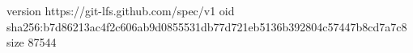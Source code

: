 version https://git-lfs.github.com/spec/v1
oid sha256:b7d86213ac4f2c606ab9d0855531db77d721eb5136b392804c57447b8cd7a7c8
size 87544
